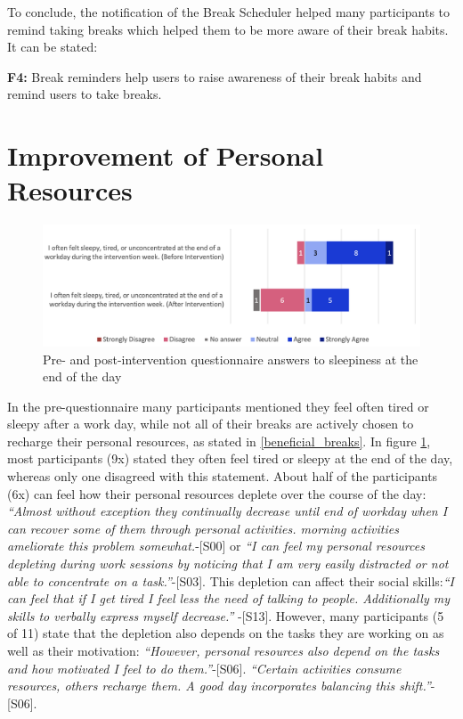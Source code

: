 \documentclass{hasel_thesis}
\begin{document}
To conclude, the notification of the Break Scheduler helped many participants to remind taking breaks which helped them to be more aware of their break habits. It can be stated:

\begin{tcolorbox}[colback=white!5!white,colframe=black!75!black]
  \textbf{F4:} Break reminders help users to raise awareness of their break habits and remind users to take breaks.
\end{tcolorbox}




\section{Improvement of Personal Resources} \label{resources}

\begin{figure}[htp]
    \centering
    \includegraphics[width=12cm]{hasel_thesis/images/agreement_3.png}
    \caption{Pre- and post-intervention questionnaire answers to sleepiness at the end of the day}
    \label{fig:sleepiness_agreement}
\end{figure}

In the pre-questionnaire many participants mentioned they feel often tired or sleepy after a work day, while not all of their breaks are actively chosen to recharge their personal resources, as stated in \ref{beneficial_breaks}. In figure \ref{fig:sleepiness_agreement}, most participants (9x) stated  they often feel tired or sleepy at the end of the day, whereas only one disagreed with this statement. About half of the participants (6x) can feel how their personal resources deplete over the course of the day: \textit{“Almost without exception they continually decrease until end of workday when I can recover some of them through personal activities. morning activities ameliorate this problem somewhat.}-[S00] or \textit{“I can feel my personal resources depleting during work sessions by noticing that I am very easily distracted or not able to concentrate on a task.”}-[S03]. This depletion can affect their social skills:\textit{“I can feel that if I get tired I feel less the need of talking to people. Additionally my skills to verbally express myself decrease.” } -[S13]. However, many participants (5 of 11) state that the depletion also depends on the tasks they are working on as well as their motivation: \textit{“However, personal resources also depend on the tasks and how motivated I feel to do them.”}-[S06]. \textit{“Certain activities consume resources, others recharge them. A good day incorporates balancing this shift.”}- [S06]. 
\end{document}
